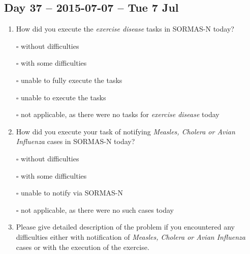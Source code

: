 \documentclass[a4paper, titlepage]{tufte-handout}
\begin{document}
\subsection{Day 37 -- 2015-07-07 -- Tue  7 Jul}
\label{sec-8-27}
\begin{enumerate}
\item How did you execute the \emph{exercise disease} tasks in SORMAS-N today?

\quad $\square$ without difficulties

\quad $\square$ with some difficulties

\quad $\square$ unable to fully execute the tasks

\quad $\square$ unable to execute the tasks

\quad $\square$ not applicable, as there were no tasks for \emph{exercise disease} today

\item How did you execute your task of notifying \emph{Measles, Cholera or Avian Influenza} cases in SORMAS-N today?

\quad $\square$ without difficulties

\quad $\square$ with some difficulties

\quad $\square$ unable to notify via SORMAS-N

\quad $\square$ not applicable, as there were no such cases today

\item Please give detailed description of the problem if you encountered any difficulties either with notification of \emph{Measles, Cholera or Avian Influenza} cases or with the execution of the exercise.

\hrulefill

\hrulefill

\hrulefill

\hrulefill

\hrulefill

\hrulefill

\hrulefill

\hrulefill

\hrulefill

\hrulefill
\end{enumerate}

\newpage
\end{document}
